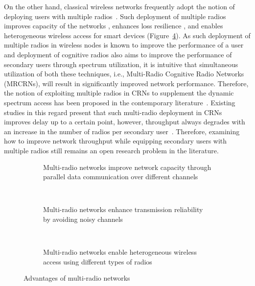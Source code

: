 
On the other hand, classical wireless networks frequently adopt the notion of deploying users with multiple radios~\cite{bahl2004reconsidering, adya2004multi}. Such deployment of multiple radios improves capacity of the networks \cite{draves2004routing, bahl2004reconsidering}, enhances loss resilience \cite{miu2005improving}, and enables heterogeneous wireless access for smart devices \cite{song2012performance} (Figure~\ref{fig:advMRN}). As such deployment of multiple radios in wireless nodes is known to improve the performance of a user and  deployment of cognitive radios also aims to improve the performance of secondary users through spectrum utilization, it is intuitive that simultaneous utilization of both these techniques, i.e., Multi-Radio Cognitive Radio Networks (MRCRNs), will result in significantly improved network performance. Therefore, the notion of exploiting multiple radios in CRNs to supplement the dynamic spectrum access has been proposed in the contemporary literature~\cite{li2014deterministic, zhong2014capacity, khan2015towards}. Existing studies in this regard present that such multi-radio deployment in CRNs improves delay up to a certain point, however, throughput always degrades with an increase in the number of radios per secondary user~\cite{khan2015towards}. Therefore, examining how to improve network throughput while equipping secondary users with multiple radios still remains an open research problem in the literature.

\begin{figure}[!htbp]
    \centering
    \begin{subfigure}[t]{0.3\textwidth}
        
        \caption{Multi-radio networks improve network capacity through parallel data communication over different channels}
        \label{fig:improvedNetworkCapacity}
    \end{subfigure}
    ~
    \begin{subfigure}[t]{0.3\textwidth}
        
        \caption{Multi-radio networks enhance transmission reliability by avoiding noisy channels}
        \label{fig:enhancedLossResilence}
    \end{subfigure}
    ~
    \begin{subfigure}[t]{0.3\textwidth}
        
        \caption{Multi-radio networks enable heterogeneous wireless access using different types of radios}
        \label{fig:heterogenousAccess}
    \end{subfigure}
    \caption{Advantages of multi-radio networks}
    \label{fig:advMRN}
\end{figure}


